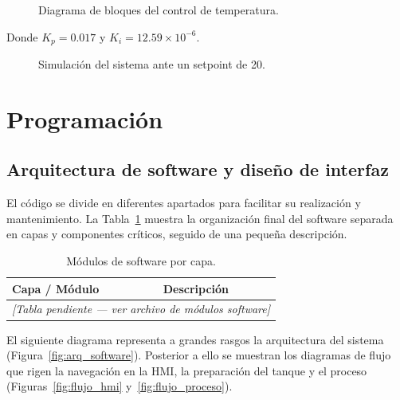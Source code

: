 \documentclass[11pt,tesis,twoside,openright,spanish]{upiiztt}
\begin{document}
\begin{figure}[H]
  \centering
  \caption{Diagrama de bloques del control de temperatura.}
  \label{fig:bloques_temp}
\end{figure}

Donde $K_p = 0.017$ y $K_i = 12.59 \times 10^{-6}$.

\begin{figure}[H]
  \centering
  \caption{Simulación del sistema ante un setpoint de 20.}
  \label{fig:sim_sp20}
\end{figure}

\section{Programación}

\subsection{Arquitectura de software y diseño de interfaz}

El código se divide en diferentes apartados para facilitar su realización y mantenimiento. La Tabla~\ref{tab:modulos_software} muestra la organización final del software separada en capas y componentes críticos, seguido de una pequeña descripción.

\begin{table}[H]
  \centering
  \caption{Módulos de software por capa.}
  \label{tab:modulos_software}
  \begin{tabular}{ll}
    \toprule
    \textbf{Capa / Módulo} & \textbf{Descripción} \\
    \midrule
    \multicolumn{2}{c}{\textit{[Tabla pendiente — ver archivo de módulos software]}} \\
    \bottomrule
  \end{tabular}
\end{table}

El siguiente diagrama representa a grandes rasgos la arquitectura del sistema (Figura~\ref{fig:arq_software}). Posterior a ello se muestran los diagramas de flujo que rigen la navegación en la HMI, la preparación del tanque y el proceso (Figuras~\ref{fig:flujo_hmi} y~\ref{fig:flujo_proceso}).
\end{document}
